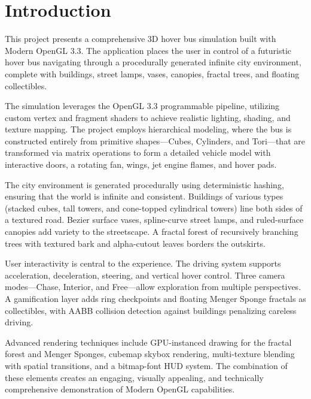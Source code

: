 \documentclass[12pt,a4paper]{article}
\begin{document}
\section{Introduction}

This project presents a comprehensive 3D hover bus simulation built with Modern OpenGL 3.3. The application places the user in control of a futuristic hover bus navigating through a procedurally generated infinite city environment, complete with buildings, street lamps, vases, canopies, fractal trees, and floating collectibles.

The simulation leverages the OpenGL 3.3 programmable pipeline, utilizing custom vertex and fragment shaders to achieve realistic lighting, shading, and texture mapping. The project employs hierarchical modeling, where the bus is constructed entirely from primitive shapes---Cubes, Cylinders, and Tori---that are transformed via matrix operations to form a detailed vehicle model with interactive doors, a rotating fan, wings, jet engine flames, and hover pads.

The city environment is generated procedurally using deterministic hashing, ensuring that the world is infinite and consistent. Buildings of various types (stacked cubes, tall towers, and cone-topped cylindrical towers) line both sides of a textured road. Bezier surface vases, spline-curve street lamps, and ruled-surface canopies add variety to the streetscape. A fractal forest of recursively branching trees with textured bark and alpha-cutout leaves borders the outskirts.

User interactivity is central to the experience. The driving system supports acceleration, deceleration, steering, and vertical hover control. Three camera modes---Chase, Interior, and Free---allow exploration from multiple perspectives. A gamification layer adds ring checkpoints and floating Menger Sponge fractals as collectibles, with AABB collision detection against buildings penalizing careless driving.

Advanced rendering techniques include GPU-instanced drawing for the fractal forest and Menger Sponges, cubemap skybox rendering, multi-texture blending with spatial transitions, and a bitmap-font HUD system. The combination of these elements creates an engaging, visually appealing, and technically comprehensive demonstration of Modern OpenGL capabilities.
\end{document}
